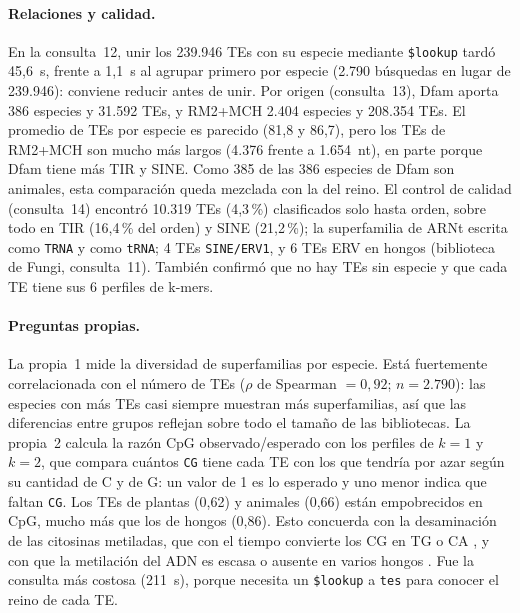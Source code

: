 \documentclass[unnumsec,namedate,webpdf,contemporary,large]{oup-authoring-template}
\begin{document}
\paragraph{Relaciones y calidad.} En la consulta~12, unir los 239.946 TEs con su especie mediante \texttt{\$lookup} tard\'o 45,6~s, frente a 1,1~s al agrupar primero por especie (2.790 b\'usquedas en lugar de 239.946): conviene reducir antes de unir. Por origen (consulta~13), Dfam aporta 386 especies y 31.592 TEs, y RM2+MCH 2.404 especies y 208.354 TEs. El promedio de TEs por especie es parecido (81,8 y 86,7), pero los TEs de RM2+MCH son mucho m\'as largos (4.376 frente a 1.654~nt), en parte porque Dfam tiene m\'as TIR y SINE. Como 385 de las 386 especies de Dfam son animales, esta comparaci\'on queda mezclada con la del reino. El control de calidad (consulta~14) encontr\'o 10.319 TEs (4,3\,\%) clasificados solo hasta orden, sobre todo en TIR (16,4\,\% del orden) y SINE (21,2\,\%); la superfamilia de ARNt escrita como \texttt{TRNA} y como \texttt{tRNA}; 4 TEs \texttt{SINE/ERV1}, y 6 TEs ERV en hongos (biblioteca de Fungi, consulta~11). Tambi\'en confirm\'o que no hay TEs sin especie y que cada TE tiene sus 6 perfiles de k-mers.

\paragraph{Preguntas propias.} La propia~1 mide la diversidad de superfamilias por especie. Est\'a fuertemente correlacionada con el n\'umero de TEs ($\rho$ de Spearman $= 0{,}92$; $n = 2.790$): las especies con m\'as TEs casi siempre muestran m\'as superfamilias, as\'i que las diferencias entre grupos reflejan sobre todo el tama\~no de las bibliotecas. La propia~2 calcula la raz\'on CpG observado/esperado con los perfiles de $k = 1$ y $k = 2$, que compara cu\'antos \texttt{CG} tiene cada TE con los que tendr\'ia por azar seg\'un su cantidad de C y de G: un valor de 1 es lo esperado y uno menor indica que faltan \texttt{CG}. Los TEs de plantas (0,62) y animales (0,66) est\'an empobrecidos en CpG, mucho m\'as que los de hongos (0,86). Esto concuerda con la desaminaci\'on de las citosinas metiladas, que con el tiempo convierte los CG en TG o CA \citep{bird1980dna}, y con que la metilaci\'on del ADN es escasa o ausente en varios hongos \citep{zemach2010genome}. Fue la consulta m\'as costosa (211~s), porque necesita un \texttt{\$lookup} a \texttt{tes} para conocer el reino de cada TE.

\end{document}
